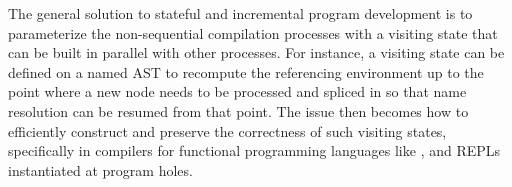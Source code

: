 The general solution to stateful and incremental program development is to parameterize the non-sequential compilation processes with a visiting state that can be built in parallel with other processes.
For instance, a visiting state can be defined on a named \ac{AST} to recompute the referencing environment up to the point where a new node needs to be processed and spliced in so that name resolution can be resumed from that point.
The issue then becomes how to efficiently construct and preserve the correctness of such visiting states, specifically in compilers for functional programming languages like \Beluga, and \acp{REPL} instantiated at program holes.


